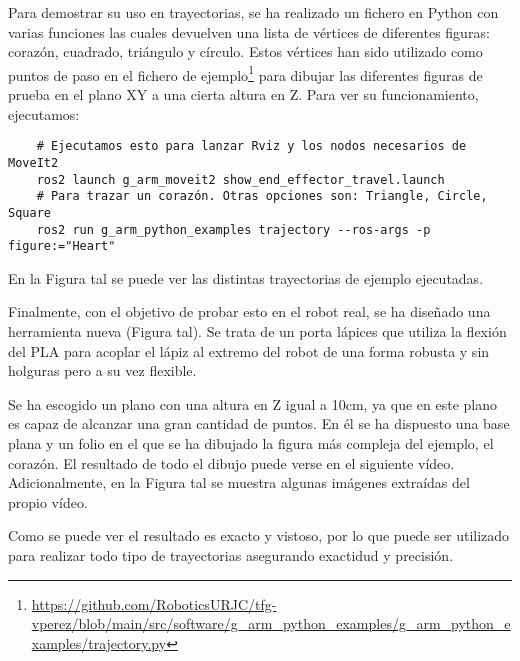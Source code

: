 Para demostrar su uso en trayectorias, se ha realizado un fichero en Python con varias funciones las cuales devuelven una lista de vértices de diferentes 
figuras: corazón, cuadrado, triángulo y círculo. Estos vértices han sido utilizado como puntos de paso en el fichero de 
ejemplo\footnote{\url{https://github.com/RoboticsURJC/tfg-vperez/blob/main/src/software/g\_arm\_python_examples/g\_arm_python\_examples/trajectory.py}} para 
dibujar las diferentes figuras de prueba en el plano XY a una cierta altura en Z. Para ver su funcionamiento, ejecutamos:
\begin{verbatim}
    # Ejecutamos esto para lanzar Rviz y los nodos necesarios de MoveIt2
    ros2 launch g_arm_moveit2 show_end_effector_travel.launch 
    # Para trazar un corazón. Otras opciones son: Triangle, Circle, Square
    ros2 run g_arm_python_examples trajectory --ros-args -p figure:="Heart"
\end{verbatim}

En la Figura tal se puede ver las distintas trayectorias de ejemplo ejecutadas.



Finalmente, con el objetivo de probar esto en el robot real, se ha diseñado una herramienta nueva (Figura tal). Se trata de un porta lápices que utiliza la 
flexión del PLA para acoplar el lápiz al extremo del robot de una forma robusta y sin holguras pero a su vez flexible.


Se ha escogido un plano con una altura en Z igual a 10cm, ya que en este plano es capaz de alcanzar una gran cantidad de puntos. En él se ha dispuesto 
una base plana y un folio en el que se ha dibujado la figura más compleja del ejemplo, el corazón. El resultado de todo el dibujo puede verse en el siguiente 
vídeo. Adicionalmente, en la Figura tal se muestra algunas imágenes extraídas del propio vídeo.


Como se puede ver el resultado es exacto y vistoso, por lo que puede ser utilizado para realizar todo tipo de trayectorias asegurando exactidud y precisión.
